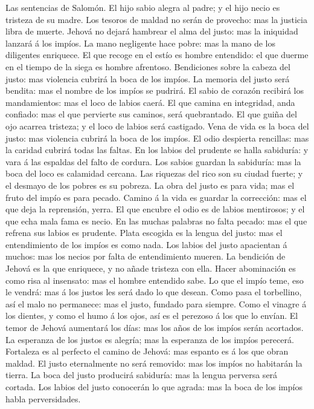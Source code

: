  Las sentencias de Salomón. El hijo sabio alegra al padre; y
el hijo necio es tristeza de su madre.  Los tesoros de
maldad no serán de provecho: mas la justicia libra de muerte.
 Jehová no dejará hambrear el alma del justo: mas la
iniquidad lanzará á los impíos.  La mano negligente hace
pobre: mas la mano de los diligentes enriquece.  El que
recoge en el estío es hombre entendido: el que duerme en el tiempo de la
siega es hombre afrentoso.  Bendiciones sobre la cabeza del
justo: mas violencia cubrirá la boca de los impíos.  La
memoria del justo será bendita: mas el nombre de los impíos se pudrirá.
 El sabio de corazón recibirá los mandamientos: mas el loco
de labios caerá.  El que camina en integridad, anda
confiado: mas el que pervierte sus caminos, será quebrantado.
 El que guiña del ojo acarrea tristeza; y el loco de labios
será castigado.  Vena de vida es la boca del justo: mas
violencia cubrirá la boca de los impíos.  El odio despierta
rencillas: mas la caridad cubrirá todas las faltas.  En los
labios del prudente se halla sabiduría: y vara á las espaldas del falto
de cordura.  Los sabios guardan la sabiduría: mas la boca
del loco es calamidad cercana.  Las riquezas del rico son
su ciudad fuerte; y el desmayo de los pobres es su pobreza.
 La obra del justo es para vida; mas el fruto del impío es
para pecado.  Camino á la vida es guardar la corrección:
mas el que deja la reprensión, yerra.  El que encubre el
odio es de labios mentirosos; y el que echa mala fama es necio.
 En las muchas palabras no falta pecado: mas el que refrena
sus labios es prudente.  Plata escogida es la lengua del
justo: mas el entendimiento de los impíos es como nada. 
Los labios del justo apacientan á muchos: mas los necios por falta de
entendimiento mueren.  La bendición de Jehová es la que
enriquece, y no añade tristeza con ella.  Hacer abominación
es como risa al insensato: mas el hombre entendido sabe. 
Lo que el impío teme, eso le vendrá: mas á los justos les será dado lo
que desean.  Como pasa el torbellino, así el malo no
permanece: mas el justo, fundado para siempre.  Como el
vinagre á los dientes, y como el humo á los ojos, así es el perezoso á
los que lo envían.  El temor de Jehová aumentará los días:
mas los años de los impíos serán acortados.  La esperanza
de los justos es alegría; mas la esperanza de los impíos perecerá.
 Fortaleza es al perfecto el camino de Jehová: mas espanto
es á los que obran maldad.  El justo eternalmente no será
removido: mas los impíos no habitarán la tierra.  La boca
del justo producirá sabiduría: mas la lengua perversa será cortada.
 Los labios del justo conocerán lo que agrada: mas la boca
de los impíos habla perversidades.

